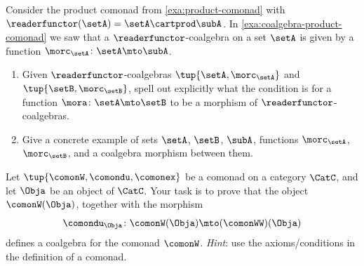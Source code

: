 \begin{gradedexercise}
    \label{ex:ProductComonadCoalgebraMorphisms}
    Consider the product comonad from \cref{exa:product-comonad} with $\readerfunctor(\setA) = \setA \cartprod \subA$.
    In \cref{exa:coalgebra-product-comonad} we saw that a $\readerfunctor$-coalgebra on a set $\setA$ is given by a function $\morc_\setA \colon \setA \mto \subA$.
    \begin{enumerate}
        \item Given $\readerfunctor$-coalgebras $\tup{\setA, \morc_\setA}$ and $\tup{\setB, \morc_\setB}$, spell out explicitly what the condition is for a function $\mora \colon \setA \mto \setB$ to be a morphism of $\readerfunctor$-coalgebras.
        \item Give a concrete example of sets $\setA$, $\setB$, $\subA$, functions $\morc_\setA$, $\morc_\setB$, and a coalgebra morphism between them.
    \end{enumerate}
\end{gradedexercise}

\begin{gradedexercise}
    \label{ex:CofreeCoalgebras}
    Let $\tup{\comonW, \comondu, \comonex}$ be a comonad on a category $\CatC$, and let $\Obja$ be an object of $\CatC$.
    Your task is to prove that the object $\comonW(\Obja)$, together with the morphism
    \begin{equation}
        \comondu_\Obja \colon \comonW(\Obja) \mto (\comonWW)(\Obja)
    \end{equation}
    defines a coalgebra for the comonad $\comonW$.
    \emph{Hint}: use the axioms/conditions in the definition of a comonad.
\end{gradedexercise}
